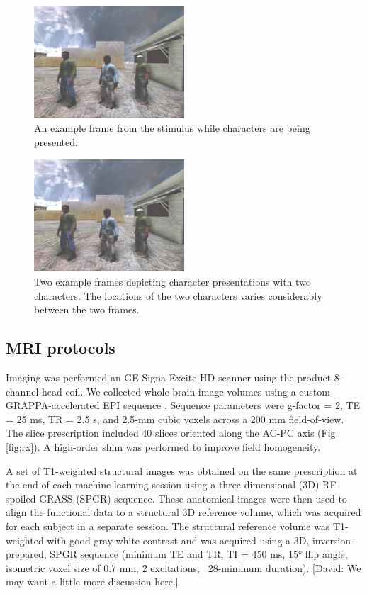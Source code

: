 \documentclass[final]{article}
\begin{document}
\begin{figure}[!htbp]
\centering
\includegraphics[width=0.5\textwidth]{figures/stimulus-characters}
\caption{An example frame from the stimulus while characters are being presented.}
\label{fig:stimulus-characters}
\end{figure}

\begin{figure}[!htbp]
\centering
\includegraphics[width=0.5\textwidth]{figures/stimulus-location}
\caption{Two example frames depicting character presentations with two characters. The locations of the two characters varies considerably between the two frames.}
\label{fig:stimulus-location}
\end{figure}

\subsection{MRI protocols}
Imaging was performed an GE Signa Excite HD scanner using the product 8-channel head coil. We 
collected whole brain image volumes using a custom GRAPPA-accelerated EPI sequence \cite{newbold}. Sequence 
parameters were g-factor = 2,  TE = 25 ms, TR = 2.5 s, and  2.5-mm cubic voxels across a 200 mm 
field-of-view. The slice prescription included 40 slices oriented along the AC-PC axis (Fig. \ref{fig:rx}). 
A high-order shim was  performed to improve field homogeneity.

A set of T1-weighted structural images was obtained on the same prescription at the end of each 
machine-learning session using a three-dimensional (3D) RF-spoiled GRASS (SPGR) sequence. These 
anatomical images were then used to align the functional data to a structural 3D reference volume, 
which was acquired for each subject in a separate session. The structural reference volume was 
T1-weighted with good gray-white contrast and was acquired using a 3D, inversion-prepared, SPGR 
sequence (minimum TE and TR, TI = 450 ms, 15° flip angle, isometric voxel size of 0.7 mm, 2 
excitations, ~28-minimum duration).
[David: We may want a little more discussion here.]
\end{document}
